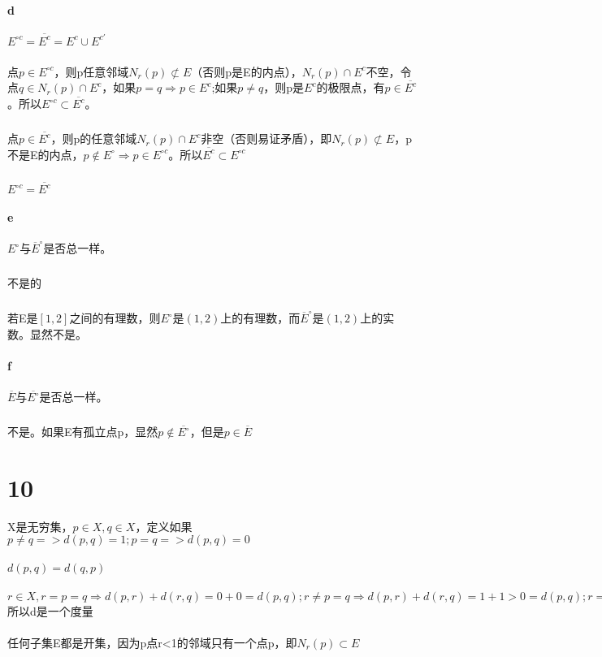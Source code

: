 \paragraph{d}$E^{\circ c} = \overline{E^c} = E^c \cup E^{c'}$
\subparagraph{} 点$p \in E^{\circ c}$，则p任意邻域$N_r(p) \not \subset E$（否则p是E的内点），$N_r(p) \cap E^c$不空，令点$q \in N_r(p) \cap E^c$，如果$p=q \Rightarrow p \in E^c$;如果$p \ne q$，则p是$E^c$的极限点，有$p \in \overline{E^c}$。所以$E^{\circ c} \subset \overline{E^c}$。
\subparagraph{} 点$p \in \overline{E^c}$，则p的任意邻域$N_r(p) \cap E^c$非空（否则易证矛盾），即$N_r(p) \not \subset E$，p不是E的内点，$p \notin E^{\circ} \Rightarrow p \in E^{\circ c}$。所以$\overline{E^c} \subset E^{\circ c}$
\subparagraph{} $E^{\circ c} = \overline{E^c}$
\paragraph{e} $E^{\circ}$与${\overline{E}}^{\circ}$是否总一样。
\subparagraph{} 不是的
\subparagraph{} 若E是$[1,2]$之间的有理数，则$E^{\circ}$是$(1,2)$上的有理数，而$\overline{E}^{\circ}$是$(1,2)$上的实数。显然不是。
\paragraph{f} $\overline{E}$与$\overline{E^{\circ}}$是否总一样。
\subparagraph{} 不是。如果E有孤立点p，显然$p \notin \overline{E^{\circ}}$，但是$p \in \overline{E}$
\section*{10} X是无穷集，$p \in X, q \in X $，定义如果$ p \ne q => d(p,q)=1; p = q => d(p,q) = 0$
\paragraph{} $d(p, q) = d(q, p)$
\paragraph{} $ r \in X, r=p=q \Rightarrow d(p, r) + d(r, q) = 0 + 0 = d(p,q); r \ne p=q \Rightarrow d(p, r) + d(r, q) = 1 + 1 > 0 = d(p, q); r=p \ne q \Rightarrow d(p, r) + d(r, q) = 0 + 1 = 1 = d(p, q); r = q \ne p 同 r=p \ne q; r \ne p \ ne q \Rightarrow d(p, r) + d(r, q) = 1 + 1 > 1 = d(p, q) $ 所以d是一个度量
\paragraph{} 任何子集E都是开集，因为p点r<1的邻域只有一个点p，即$N_r(p) \subset E$
